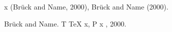 \documentclass[11pt]{article}
\date{\today}
\title{}
\begin{document}
\tableofcontents

x (Br{\"u}ck {and} \alpha{} Name, 2000), Br{\"u}ck {and} \alpha{} Name (2000).

\noindent
Br{\"u}ck {and} \alpha{} Name. T {\TeX} \alpha{} x, P {x} \beta{}, 2000.
\end{document}
